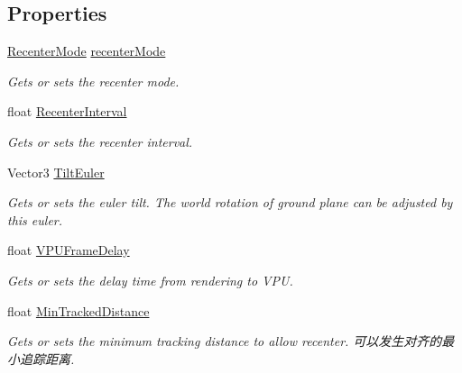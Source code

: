 \subsection*{Properties}
\begin{DoxyCompactItemize}
\item 
\mbox{\hyperlink{class_ximmerse_1_1_rhino_x_1_1_ground_plane_a8813fd8673b953d9d9eb5e87b16cad14}{Recenter\+Mode}} \mbox{\hyperlink{class_ximmerse_1_1_rhino_x_1_1_ground_plane_a9d8f6a9a11b6f928eb2312dd829ddc80}{recenter\+Mode}}
\begin{DoxyCompactList}\small\item\em Gets or sets the recenter mode. \end{DoxyCompactList}\item 
float \mbox{\hyperlink{class_ximmerse_1_1_rhino_x_1_1_ground_plane_a038a86a7608ce2283055c64b7c29848a}{Recenter\+Interval}}
\begin{DoxyCompactList}\small\item\em Gets or sets the recenter interval. \end{DoxyCompactList}\item 
Vector3 \mbox{\hyperlink{class_ximmerse_1_1_rhino_x_1_1_ground_plane_a898f82c1d352c5f0749184d6fa346282}{Tilt\+Euler}}
\begin{DoxyCompactList}\small\item\em Gets or sets the euler tilt. The world rotation of ground plane can be adjusted by this euler. \end{DoxyCompactList}\item 
float \mbox{\hyperlink{class_ximmerse_1_1_rhino_x_1_1_ground_plane_ad865efbe2157148db7f6ee7513b461b8}{V\+P\+U\+Frame\+Delay}}
\begin{DoxyCompactList}\small\item\em Gets or sets the delay time from rendering to V\+PU. \end{DoxyCompactList}\item 
float \mbox{\hyperlink{class_ximmerse_1_1_rhino_x_1_1_ground_plane_aeb62f8cf91b1beb542a7f109ee15cc7d}{Min\+Tracked\+Distance}}
\begin{DoxyCompactList}\small\item\em Gets or sets the minimum tracking distance to allow recenter. 可以发生对齐的最小追踪距离. \end{DoxyCompactList}\item 

\end{DoxyCompactItemize}
